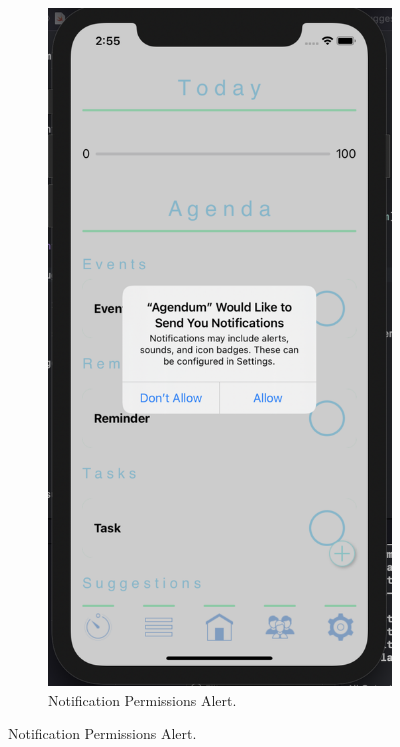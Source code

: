 \begin{figure}[H]
\begin{subfigure}[b]{0.3\textwidth}
    \end{subfigure}
    \hfill
    \begin{subfigure}[b]{0.3\textwidth}
        \centering
        \includegraphics[width=\textwidth]{./graphics/Implementation/Add Item/notifications alert.png}
        \caption{Notification Permissions Alert.}

\end{subfigure}
\end{figure}
